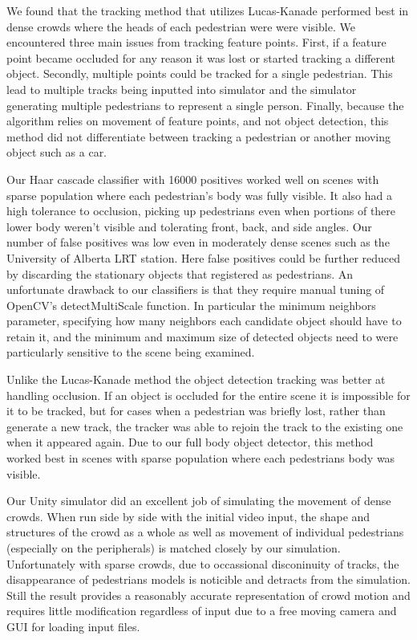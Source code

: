 \documentclass[12pt, onecolumn, conference]{IEEEtran}
\begin{document}
We found that the tracking method that utilizes Lucas-Kanade performed best in dense crowds where the heads of each pedestrian were were visible. We encountered three main issues from tracking feature points. First, if a feature point became occluded for any reason it was lost or started tracking a different object. Secondly, multiple points could be tracked for a single pedestrian. This lead to multiple tracks being inputted into simulator and the simulator generating multiple pedestrians to represent a single person. Finally, because the algorithm relies on movement of feature points, and not object detection, this method did not differentiate between tracking a pedestrian or  another moving object such as a car.

Our Haar cascade classifier with 16000 positives worked well on scenes with sparse population where each pedestrian's body was fully visible. It also had a high tolerance to occlusion, picking up pedestrians even when portions of there lower body weren't visible and tolerating front, back, and side angles. Our number of false positives was low even in moderately dense scenes such as the University of Alberta LRT station. Here false positives could be further reduced by discarding the stationary objects that registered as pedestrians. An unfortunate drawback to our classifiers is that they require manual tuning of OpenCV's detectMultiScale function. In particular  the minimum neighbors parameter, specifying how many neighbors each candidate object should have to retain it, and the minimum and maximum size of detected objects need to were particularly sensitive to the scene being examined. 

Unlike the Lucas-Kanade method the object detection tracking was better at handling occlusion. If an object is occluded for the entire scene it is impossible for it to be tracked, but for cases when a pedestrian was briefly lost, rather than generate a new track, the tracker was able to rejoin the track to the existing one when it appeared again. Due to our full body object detector, this method worked best in scenes with sparse population where each pedestrians body was visible. 

Our Unity simulator did an excellent job of simulating the movement of dense crowds. When run side by side with the initial video input, the shape and structures of the crowd as a whole as well as movement of individual pedestrians (especially on the peripherals) is matched closely by our simulation. Unfortunately with sparse crowds, due to occassional disconinuity of tracks, the disappearance of pedestrians models is noticible and detracts from the simulation. Still the result provides a reasonably accurate representation of crowd motion and requires little modification regardless of input due to a free moving camera and GUI for loading input files.
\end{document}

